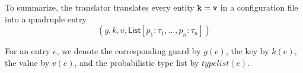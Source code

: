 To summarize, the translator translates every entity ${\tt {k = v}}$ in a configuration file into a quadruple entry
$$(g,k,v,\textsf{List}[p_1:\tau_1, \ldots, p_n:\tau_n])$$

For an entry $e$, we denote the corresponding guard by $g(e)$, the key by $k(e)$, the value by $v(e)$, and the probabilistic
type list by $typelist(e)$. 

